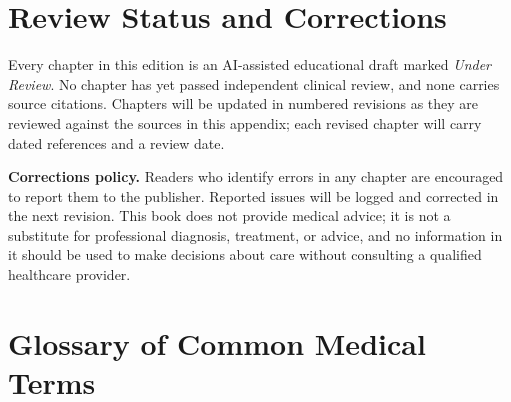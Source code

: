 \documentclass[12pt,oneside]{book}
\begin{document}
\section*{Review Status and Corrections}
Every chapter in this edition is an AI-assisted educational draft marked \emph{Under Review}. No chapter has yet passed independent clinical review, and none carries source citations. Chapters will be updated in numbered revisions as they are reviewed against the sources in this appendix; each revised chapter will carry dated references and a review date.

\medskip
\noindent\textbf{Corrections policy.} Readers who identify errors in any chapter are encouraged to report them to the publisher. Reported issues will be logged and corrected in the next revision. This book does not provide medical advice; it is not a substitute for professional diagnosis, treatment, or advice, and no information in it should be used to make decisions about care without consulting a qualified healthcare provider.

\section*{Glossary of Common Medical Terms}
\end{document}
